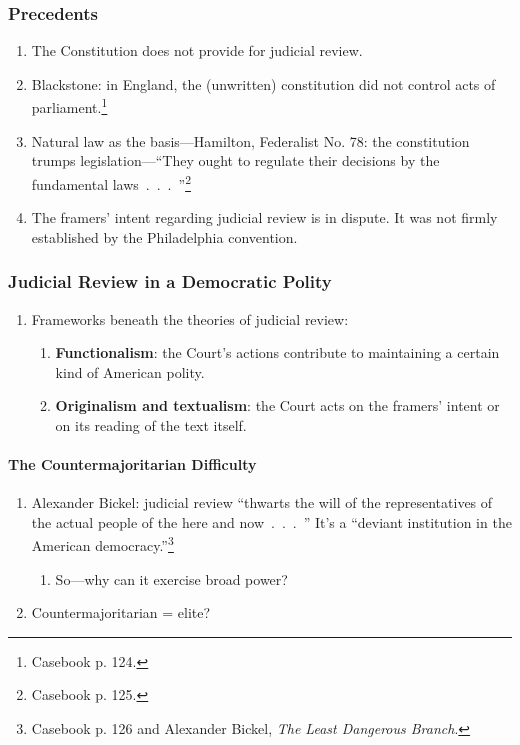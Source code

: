 \begin{enumerate}
\subsubsection{Precedents}

\begin{enumerate}
    \item The Constitution does not provide for judicial review.
    \item Blackstone: in England, the (unwritten) constitution did not control 
    acts of parliament.\footnote{Casebook p. 124.}
    \item Natural law as the basis---Hamilton, Federalist No. 78: the 
    constitution trumps legislation---``They ought to regulate their decisions 
    by the fundamental laws~.~.~.~''\footnote{Casebook p. 125.}
    \item The framers' intent regarding judicial review is in dispute. It was 
    not firmly established by the Philadelphia convention.
\end{enumerate}

\subsubsection{Judicial Review in a Democratic Polity}

\begin{enumerate}
    \item Frameworks beneath the theories of judicial review:
    \begin{enumerate}
        \item \textbf{Functionalism}: the Court's actions contribute to 
        maintaining a certain kind of American polity.
        \item \textbf{Originalism and textualism}: the Court acts on the framers' 
        intent or on its reading of the text itself.
    \end{enumerate}
\end{enumerate}

\paragraph{The Countermajoritarian Difficulty}

\begin{enumerate}
    \item Alexander Bickel: judicial review ``thwarts the will of the 
    representatives of the actual people of the here and now~.~.~.~'' It's a 
    ``deviant institution in the American democracy.''\footnote{Casebook p. 
    126 and Alexander Bickel, \emph{The Least Dangerous Branch}.}
    \begin{enumerate}
        \item So---why can it exercise broad power?
    \end{enumerate}
    \item Countermajoritarian = elite?
\end{enumerate}


\end{enumerate}

